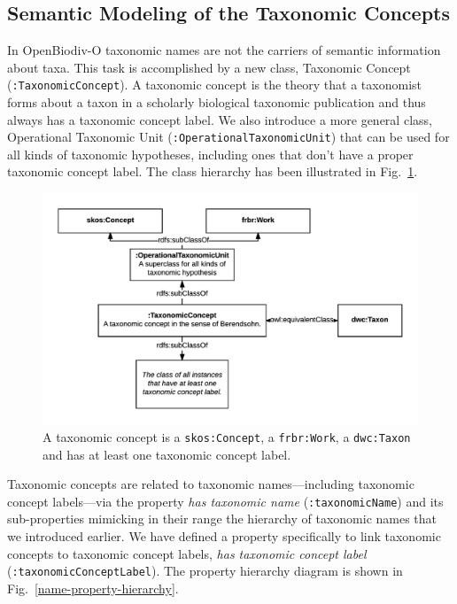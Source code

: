 \subsection{Semantic Modeling of the Taxonomic Concepts}

In \mbox{OpenBiodiv-O} taxonomic names are not the carriers of semantic information about taxa. This task is accomplished by a new class, Taxonomic Concept ({\tt :TaxonomicConcept}). A taxonomic concept is the theory that a taxonomist forms about a taxon in a scholarly biological taxonomic publication and thus always has a taxonomic concept label. We also introduce a more general class, Operational Taxonomic Unit ({\tt :OperationalTaxonomicUnit}) that can be used for all kinds of taxonomic hypotheses, including ones that don't have a proper taxonomic concept label. The class hierarchy has been illustrated in Fig.~\ref{taxonomic-concept-diagram}.

\begin{figure}[h!]
\centering
  \includegraphics[width=\textwidth]{Figures/taxonomic-concept-diagram}
  \decoRule
  \caption[Taxonomic concept diagram.]{
  A taxonomic concept is a {\tt skos:Concept}, a {\tt frbr:Work}, a {\tt dwc:Taxon} and has at least one taxonomic concept label.}
  \label{taxonomic-concept-diagram}
\end{figure}

Taxonomic concepts are related to taxonomic names---including taxonomic concept labels---via the property \emph{has taxonomic name} ({\tt :taxonomicName}) and its sub-properties mimicking in their range the hierarchy of taxonomic names that we introduced earlier. We have defined a property specifically to link taxonomic concepts to taxonomic concept labels, \emph{has taxonomic concept label} ({\tt :taxonomicConceptLabel}). The property hierarchy diagram is shown in Fig.~\ref{name-property-hierarchy}.

